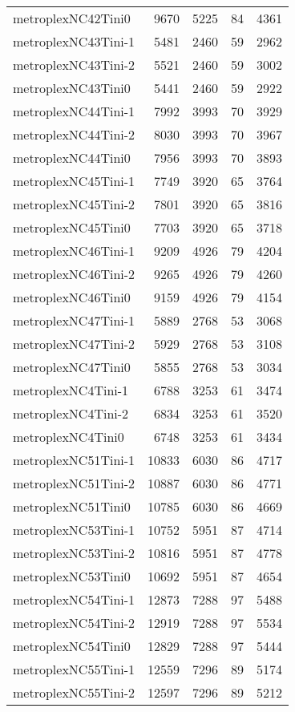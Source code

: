 \documentclass[../../../thesis.tex]{subfiles}
\begin{document}
\begin{longtable}{lrrrr}
metroplexNC42Tini0 & 9670 & 5225 & 84 & 4361 \\
metroplexNC43Tini-1 & 5481 & 2460 & 59 & 2962 \\
metroplexNC43Tini-2 & 5521 & 2460 & 59 & 3002 \\
metroplexNC43Tini0 & 5441 & 2460 & 59 & 2922 \\
metroplexNC44Tini-1 & 7992 & 3993 & 70 & 3929 \\
metroplexNC44Tini-2 & 8030 & 3993 & 70 & 3967 \\
metroplexNC44Tini0 & 7956 & 3993 & 70 & 3893 \\
metroplexNC45Tini-1 & 7749 & 3920 & 65 & 3764 \\
metroplexNC45Tini-2 & 7801 & 3920 & 65 & 3816 \\
metroplexNC45Tini0 & 7703 & 3920 & 65 & 3718 \\
metroplexNC46Tini-1 & 9209 & 4926 & 79 & 4204 \\
metroplexNC46Tini-2 & 9265 & 4926 & 79 & 4260 \\
metroplexNC46Tini0 & 9159 & 4926 & 79 & 4154 \\
metroplexNC47Tini-1 & 5889 & 2768 & 53 & 3068 \\
metroplexNC47Tini-2 & 5929 & 2768 & 53 & 3108 \\
metroplexNC47Tini0 & 5855 & 2768 & 53 & 3034 \\
metroplexNC4Tini-1 & 6788 & 3253 & 61 & 3474 \\
metroplexNC4Tini-2 & 6834 & 3253 & 61 & 3520 \\
metroplexNC4Tini0 & 6748 & 3253 & 61 & 3434 \\
metroplexNC51Tini-1 & 10833 & 6030 & 86 & 4717 \\
metroplexNC51Tini-2 & 10887 & 6030 & 86 & 4771 \\
metroplexNC51Tini0 & 10785 & 6030 & 86 & 4669 \\
metroplexNC53Tini-1 & 10752 & 5951 & 87 & 4714 \\
metroplexNC53Tini-2 & 10816 & 5951 & 87 & 4778 \\
metroplexNC53Tini0 & 10692 & 5951 & 87 & 4654 \\
metroplexNC54Tini-1 & 12873 & 7288 & 97 & 5488 \\
metroplexNC54Tini-2 & 12919 & 7288 & 97 & 5534 \\
metroplexNC54Tini0 & 12829 & 7288 & 97 & 5444 \\
metroplexNC55Tini-1 & 12559 & 7296 & 89 & 5174 \\
metroplexNC55Tini-2 & 12597 & 7296 & 89 & 5212 \\

\end{longtable}
\end{document}
